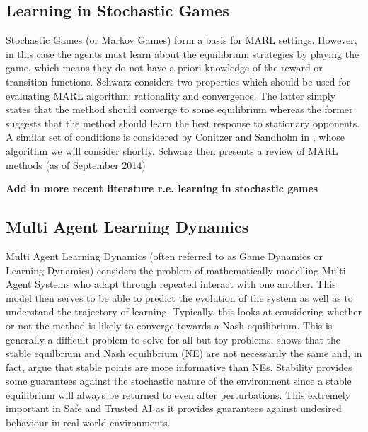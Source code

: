 \documentclass[.../main.tex]{subfiles}
\begin{document}
\subsection{Learning in Stochastic Games} \label{sec::Learning_Stochastic_Games}

Stochastic Games (or Markov Games) form a basis for MARL settings. However, in this case the agents
must learn about the equilibrium strategies by playing the game, which means they do not have a
priori knowledge of the reward or transition functions. Schwarz considers two properties which
should be used for evaluating MARL algorithm: rationality and convergence. The latter simply states
that the method should converge to some equilibrium whereas the former suggests that the method
should learn the best response to stationary opponents. A similar set of conditions is considered by
Conitzer and Sandholm in \cite{ConitzerAWESOME:}, whose algorithm we will consider shortly. Schwarz
then presents a review of MARL methods (as of September 2014)

\textbf{Add in more recent literature r.e. learning in stochastic games}

\subsection{Multi Agent Learning Dynamics} \label{sec::MARL_Dynamics}

Multi Agent Learning Dynamics (often referred to as Game Dynamics or Learning Dynamics)
considers the
problem of mathematically modelling Multi Agent Systems who adapt through repeated interact with one
another. This model then serves to be able to predict the evolution of the system as well as to
understand the trajectory of learning. Typically, this looks at considering whether or not the
method is likely to converge towards a Nash equilibrium. This is generally a difficult problem to
solve \cite{ShohamMultiagentFoundations} for all but toy problems.
\cite{Letcher2019DifferentiableMechanics} shows that the stable equilbrium and Nash equilibrium (NE)
are not necessarily the same and, in fact, argue that stable points are more informative than NEs.
Stability provides some guarantees against the stochastic nature of the environment since a stable
equilibrium will always be returned to even after perturbations. This extremely important in Safe
and Trusted AI as it provides guarantees against undesired behaviour in real world environments.
\end{document}
